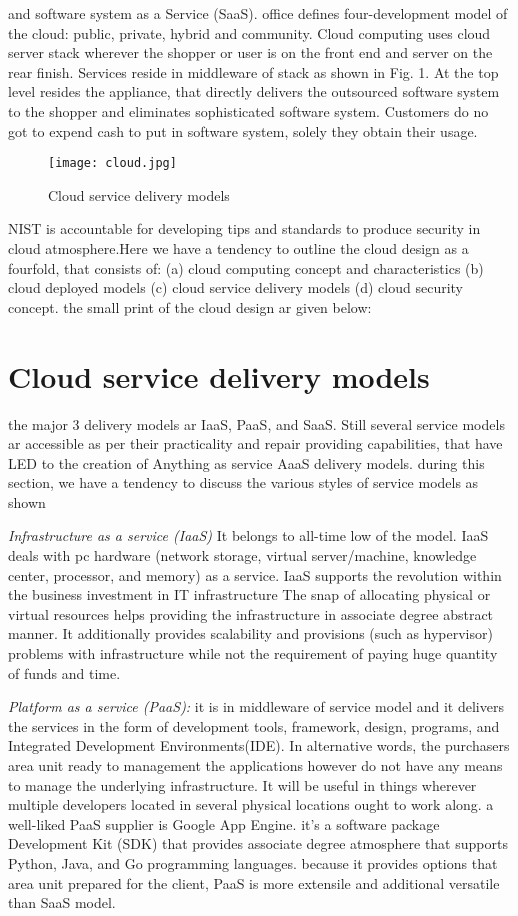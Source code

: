 and software system as a Service (SaaS). office defines four-development model of the cloud: public, private, hybrid and community. Cloud computing uses cloud server stack wherever the shopper or user is on the front end and server on the rear finish. Services reside in middleware of stack as shown in Fig. 1. At the top level resides the appliance, that directly delivers the outsourced software system to the shopper and eliminates sophisticated software system. Customers do no got to expend cash to put in software system, solely they obtain their usage.\begin{figure}
	\centering
	\texttt{[image: cloud.jpg]} 
	\caption{Cloud service delivery models}
	\label{fig:cloud}
\end{figure}


NIST is accountable for developing tips and standards to produce security in cloud atmosphere.Here we have a tendency to outline the cloud design as a fourfold, that consists of: (a) cloud computing concept and characteristics (b) cloud deployed models (c) cloud service delivery models (d) cloud security concept. the small print of the cloud design ar given below:

\section{Cloud service delivery models}
the major 3 delivery models ar IaaS, PaaS, and SaaS. Still several service models ar accessible as per their practicality and repair providing capabilities, that have LED to the creation of Anything as service AaaS delivery models. during this section, we have a tendency to discuss the various styles of service models as shown

\textit{Infrastructure as a service (IaaS)} It belongs to all-time low of the model. IaaS deals with pc hardware (network storage, virtual server/machine, knowledge center, processor, and memory) as a service. IaaS supports the revolution within the business investment in IT infrastructure The snap of allocating physical or virtual resources helps providing the infrastructure in associate degree abstract manner. It additionally provides scalability and provisions (such as hypervisor) problems with infrastructure while not the requirement of paying huge quantity of funds and time.


\textit{Platform as a service (PaaS):} it is in middleware of service model and it delivers the services in the form of development tools, framework, design, programs, and Integrated Development Environments(IDE). In alternative words, the purchasers area unit ready to management the
applications however do not have any means to manage the underlying infrastructure. It will be useful in things wherever multiple developers located in several physical locations ought to work along. a well-liked PaaS supplier is Google App
Engine. it's a software package Development Kit (SDK) that provides associate
degree atmosphere that supports Python, Java, and Go programming languages. because it provides options that area unit prepared for the client, PaaS is more extensile and additional versatile than SaaS model.

